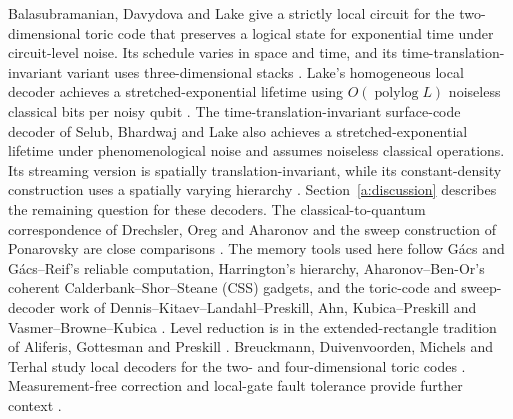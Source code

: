 Balasubramanian, Davydova and Lake give a strictly local circuit for the two-dimensional toric code that preserves a logical state for exponential time under circuit-level noise. Its schedule varies in space and time, and its time-translation-invariant variant uses three-dimensional stacks \cite{BDL2026}. Lake's homogeneous local decoder achieves a stretched-exponential lifetime using \(O(\operatorname{polylog}L)\) noiseless classical bits per noisy qubit \cite{Lake2025}. The time-translation-invariant surface-code decoder of Selub, Bhardwaj and Lake also achieves a stretched-exponential lifetime under phenomenological noise and assumes noiseless classical operations. Its streaming version is spatially translation-invariant, while its constant-density construction uses a spatially varying hierarchy \cite{SBL2026}. Section~\ref{a:discussion} describes the remaining question for these decoders. The classical-to-quantum correspondence of Drechsler, Oreg and Aharonov and the sweep construction of Ponarovsky are close comparisons \cite{DOA2026,Ponarovsky2026}. The memory tools used here follow G\'acs and G\'acs--Reif's reliable computation, Harrington's hierarchy, Aharonov--Ben-Or's coherent Calderbank--Shor--Steane (CSS) gadgets, and the toric-code and sweep-decoder work of Dennis--Kitaev--Landahl--Preskill, Ahn, Kubica--Preskill and Vasmer--Browne--Kubica \cite{ABO2008,Ahn2004,DKLP2002,Gacs2001,GacsReif1988,Harrington2004,KubicaPreskill2019,VBK2021}. Level reduction is in the extended-rectangle tradition of Aliferis, Gottesman and Preskill \cite{AGP2006}. Breuckmann, Duivenvoorden, Michels and Terhal study local decoders for the two- and four-dimensional toric codes \cite{BDMT2017}. Measurement-free correction and local-gate fault tolerance provide further context \cite{Gottesman2000,Heussen2024,PazSilva2010}.

